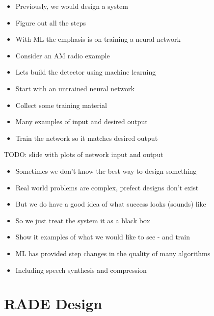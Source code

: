 \documentclass{beamer}
\begin{document}
\begin{frame}
\begin{itemize}
	\item Previously, we would design a system
	\item Figure out all the steps
	\item With ML the emphasis is on training a neural network
	\item Consider an AM radio example
	\item Lets build the detector using machine learning
\end{itemize}
\end{frame}

\begin{frame}
\begin{itemize}
	\item Start with an untrained neural network
	\item Collect some training material
	\item Many examples of input and desired output
	\item Train the network so it matches desired output
\end{itemize}
\end{frame}

\begin{frame}
	TODO: slide with plots of network input and output
\end{frame}

\begin{frame}
\begin{itemize}
	\item Sometimes we don't know the best way to design something
	\item Real world problems are complex, prefect designs don't exist
	\item But we do have a good idea of what success looks (sounds) like
	\item So we just treat the system it as a black box
	\item Show it examples of what we would like to see - and train
	\item ML has provided step changes in the quality of many algorithms
	\item Including speech synthesis and compression
\end{itemize}
\end{frame}

\section{RADE Design}
\end{document}

